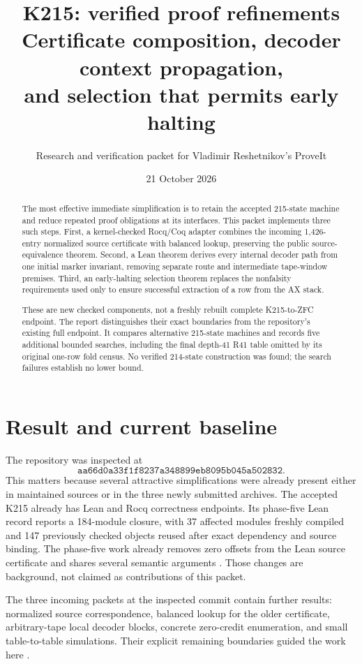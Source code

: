 \documentclass[11pt]{article}
\title{\textcolor{ink}{K215: verified proof refinements}\\[5pt]
\large Certificate composition, decoder context propagation,\\
and selection that permits early halting}
\author{Research and verification packet for Vladimir Reshetnikov's ProveIt}
\date{21 October 2026}
\theoremstyle{remark}
\begin{document}
\maketitle
\vspace{-8mm}
\begin{abstract}
The most effective immediate simplification is to retain the accepted 215-state
machine and reduce repeated proof obligations at its interfaces. This packet
implements three such steps. First, a kernel-checked Rocq/Coq adapter combines
the incoming 1,426-entry normalized source certificate with balanced lookup,
preserving the public source-equivalence theorem. Second, a Lean theorem
derives every internal decoder path from one initial marker invariant, removing
separate route and intermediate tape-window premises. Third, an early-halting
selection theorem replaces the nonfalsity requirements used only to ensure
successful extraction of a row from the AX stack.

These are new checked components, not a freshly rebuilt complete K215-to-ZFC
endpoint. The report distinguishes their exact boundaries from the repository's
existing full endpoint. It compares alternative 215-state machines and records
five additional bounded searches, including the final depth-41 R41 table omitted by its original
one-row fold census. No verified 214-state construction was found; the search
failures establish no lower bound.
\end{abstract}

\section{Result and current baseline}

The repository was inspected at
\[
\texttt{aa66d0a33f1f8237a348899eb8095b045a502832}.
\]
This matters because several attractive simplifications were already present
either in maintained sources or in the three newly submitted archives.
The accepted K215 already has Lean and Rocq correctness endpoints. Its
phase-five Lean record reports a 184-module closure, with 37 affected modules
freshly compiled and 147 previously checked objects reused after exact
dependency and source binding. The phase-five work already removes zero
offsets from the Lean source certificate and shares several semantic
arguments \cite{baseline,phase5}. Those changes are background, not claimed
as contributions of this packet.

The three incoming packets at the inspected commit contain further results:
normalized source correspondence, balanced lookup for the older certificate,
arbitrary-tape local decoder blocks, concrete zero-credit enumeration, and
small table-to-table simulations. Their explicit remaining boundaries guided
the work here \cite{checked,refinements,affine}.
\end{document}
